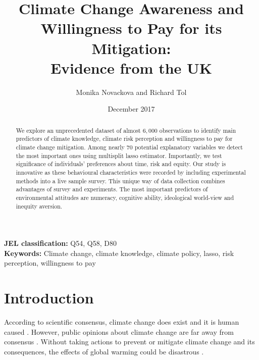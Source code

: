 \documentclass[a4paper,12pt]{article}
\date{\normalsize{December 2017}}
\title{\Large \bf Climate Change Awareness and Willingness to Pay for its Mitigation: \\ Evidence from the UK}
\author{Monika Novackova and Richard Tol}
\affil{\small{Department of Economics, University of Sussex, Falmer, UK}}
\begin{document}
  

\makeatletter
\def\hlinewd#1{%
\noalign{\ifnum0=`}\fi\hrule \@height #1 %
\futurelet\reserved@a\@xhline}
\makeatother

\maketitle
\vfill

\doublespacing

\begin{abstract}
\noindent We explore an unprecedented dataset of almost $6,000$ observations to identify main predictors of climate knowledge, climate risk perception and willingness to pay for climate change mitigation. Among nearly $70$ potential explanatory variables we detect the most important ones using multisplit lasso estimator. Importantly, we test significance of individuals' preferences about time, risk and equity. Our study is innovative as these behavioural characteristics were recorded by including experimental methods into a live sample survey. This unique way of data collection combines advantages of survey and experiments. The most important predictors of environmental attitudes are numeracy, cognitive ability, ideological world-view and inequity aversion. \\
\end{abstract}


\noindent \textbf{JEL classification:} Q54, Q58, D80\\
\noindent \textbf{Keywords:} Climate change, climate knowledge, climate policy, lasso, risk perception, willingness to pay\\




\newpage
\sloppy


\section{Introduction}\label{Introduction}

According to scientific consensus, climate change does exist and it is human caused \citep{oreskes2004, mccarthy2001impacts, Cook2013COnsensus}. However, public opinions about climate change are far away from consensus \citep{leiserowitz2012, Pew2012}. Without taking actions to prevent or mitigate climate change and its consequences, the effects of global warming could be disastrous \citep{IPCC5WG1, IPCC5, Seneviratne2012}.
\end{document}
